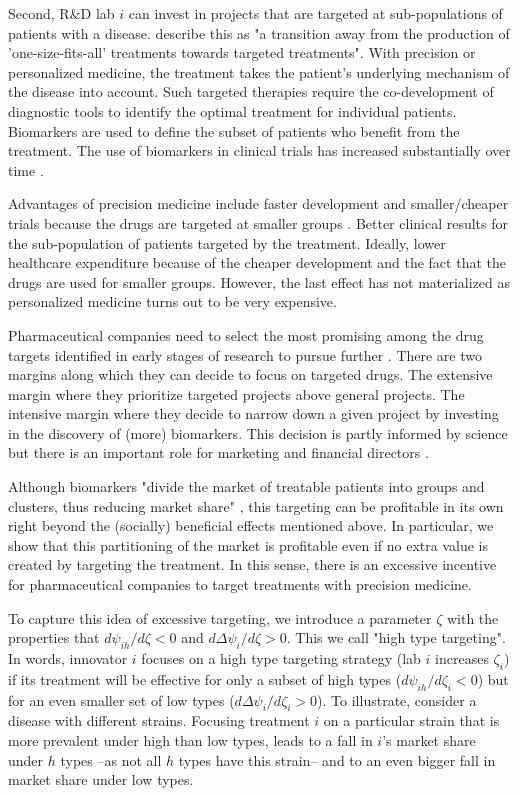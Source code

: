 \documentclass[12pt,english,a4paper]{article}
\begin{document}
Second, R\&D lab \(i\) can invest in projects that are targeted at sub-populations of patients with a disease. \cite{Dugger2018} describe this as "a transition away from the production of 'one-size-fits-all' treatments towards targeted treatments". With precision or personalized medicine, the treatment takes the patient's underlying mechanism of the disease into account. Such targeted therapies require the co-development of diagnostic tools to identify the optimal treatment for individual patients. Biomarkers are used to define the subset of patients who benefit from the treatment. The use of biomarkers in clinical trials has increased substantially over time \citep{NBERc13994}.

Advantages of precision medicine include faster development and smaller/cheaper trials because the drugs are targeted at smaller groups \citep{NBERc13994}. Better clinical results for the sub-population of patients targeted by the treatment. Ideally, lower healthcare expenditure because of the cheaper development and the fact that the drugs are used for smaller groups. However, the last effect has not materialized as personalized medicine turns out to be very expensive.

Pharmaceutical companies need to select the most promising among the drug targets identified in early stages of research to pursue further \citep{Emmerich2021,Knowles2003}. There are two margins along which they can decide to focus on targeted drugs. The extensive margin where they prioritize targeted projects above general projects. The intensive margin where they decide to narrow down a given project by investing in the discovery of (more) biomarkers. This decision is partly informed by science but there is an important role for marketing and financial directors \citep{Knowles2003}. 

Although biomarkers "divide the market of treatable patients into groups and clusters, thus reducing market share" \citep{jakka13_econom_persp_person_medic}, this targeting can be profitable in its own right beyond the (socially) beneficial effects mentioned above. In particular, we show that this partitioning of the market is profitable even if no extra value is created by targeting the treatment. In this sense, there is an excessive incentive for pharmaceutical companies to target treatments with precision medicine.

To capture this idea of excessive targeting, we introduce a parameter \(\zeta\) with the properties that \(d\psi_{ih}/d\zeta <0\) and \(d\Delta \psi_i/d\zeta>0\). This we call "high type targeting". In words, innovator \(i\) focuses on a high type targeting strategy (lab \(i\) increases \(\zeta_i\)) if its treatment will be effective for only a subset of high types (\(d\psi_{ih}/d\zeta_i <0\)) but for an even smaller set of low types (\(d\Delta\psi_i/d\zeta_i>0\)). To illustrate, consider a disease with different strains. Focusing treatment \(i\) on a particular strain that is more prevalent under high than low types, leads to a fall in \(i\)'s market share under \(h\) types --as not all \(h\) types have this strain-- and to an even bigger fall in market share under low types.
\end{document}

